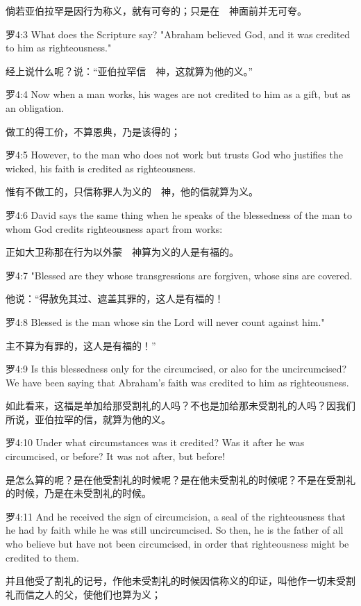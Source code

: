 \documentclass[a4paper,11pt,onecolumn,twoside]{ctexart}
\begin{document}
\begin{multicols}{2}
 倘若亚伯拉罕是因行为称义，就有可夸的；只是在　神面前并无可夸。


 罗4:3
 What does the Scripture say? "Abraham believed God, and it was credited to him as righteousness."

 经上说什么呢？说：“亚伯拉罕信　神，这就算为他的义。”


 罗4:4
 Now when a man works, his wages are not credited to him as a gift, but as an obligation.

 做工的得工价，不算恩典，乃是该得的；


 罗4:5
 However, to the man who does not work but trusts God who justifies the wicked, his faith is credited as righteousness.

 惟有不做工的，只信称罪人为义的　神，他的信就算为义。


 罗4:6
 David says the same thing when he speaks of the blessedness of the man to whom God credits righteousness apart from works:

 正如大卫称那在行为以外蒙　神算为义的人是有福的。


 罗4:7
 "Blessed are they whose transgressions are forgiven, whose sins are covered.

 他说：“得赦免其过、遮盖其罪的，这人是有福的！


 罗4:8
 Blessed is the man whose sin the Lord will never count against him."

 主不算为有罪的，这人是有福的！”


 罗4:9
 Is this blessedness only for the circumcised, or also for the uncircumcised? We have been saying that Abraham's faith was credited to him as righteousness.

 如此看来，这福是单加给那受割礼的人吗？不也是加给那未受割礼的人吗？因我们所说，亚伯拉罕的信，就算为他的义。


 罗4:10
 Under what circumstances was it credited? Was it after he was circumcised, or before? It was not after, but before!

 是怎么算的呢？是在他受割礼的时候呢？是在他未受割礼的时候呢？不是在受割礼的时候，乃是在未受割礼的时候。


 罗4:11
 And he received the sign of circumcision, a seal of the righteousness that he had by faith while he was still uncircumcised. So then, he is the father of all who believe but have not been circumcised, in order that righteousness might be credited to them.

 并且他受了割礼的记号，作他未受割礼的时候因信称义的印证，叫他作一切未受割礼而信之人的父，使他们也算为义；



\end{multicols}
\end{document}

